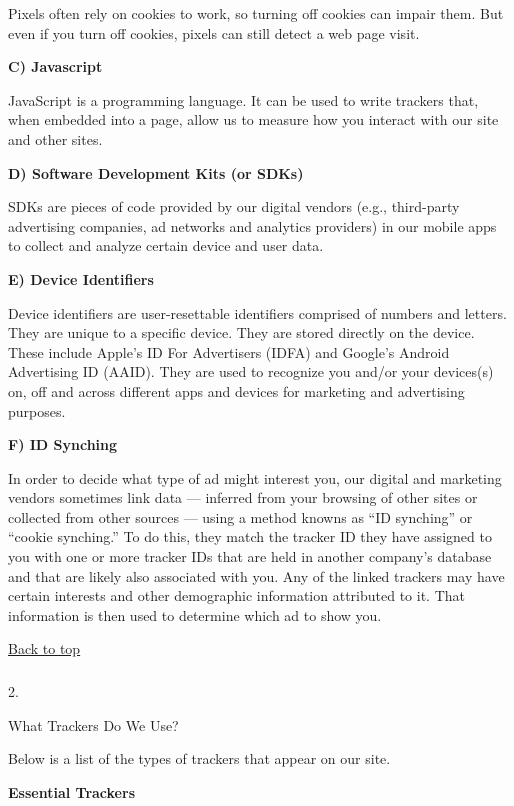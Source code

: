 Pixels often rely on cookies to work, so turning off cookies can impair
them. But even if you turn off cookies, pixels can still detect a web
page visit.

\textbf{C) Javascript}

JavaScript is a programming language. It can be used to write trackers
that, when embedded into a page, allow us to measure how you interact
with our site and other sites.

\textbf{D) Software Development Kits (or SDKs)}

SDKs are pieces of code provided by our digital vendors (e.g.,
third-party advertising companies, ad networks and analytics providers)
in our mobile apps to collect and analyze certain device and user data.

\textbf{E) Device Identifiers}

Device identifiers are user-resettable identifiers comprised of numbers
and letters. They are unique to a specific device. They are stored
directly on the device. These include Apple's ID For Advertisers (IDFA)
and Google's Android Advertising ID (AAID). They are used to recognize
you and/or your devices(s) on, off and across different apps and devices
for marketing and advertising purposes.

\textbf{F) ID Synching}

In order to decide what type of ad might interest you, our digital and
marketing vendors sometimes link data --- inferred from your browsing of
other sites or collected from other sources --- using a method knowns as
``ID synching'' or ``cookie synching.'' To do this, they match the
tracker ID they have assigned to you with one or more tracker IDs that
are held in another company's database and that are likely also
associated with you. Any of the linked trackers may have certain
interests and other demographic information attributed to it. That
information is then used to determine which ad to show you.

\href{app}{Back to top}

\hypertarget{-1}{%
\subsubsection{}\label{-1}}

2.

What Trackers Do We Use?

Below is a list of the types of trackers that appear on our site.

\textbf{Essential Trackers}

